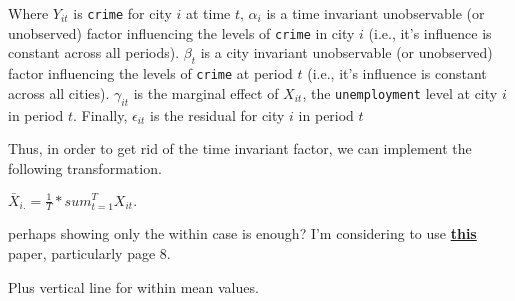 \documentclass[
]{book}
\begin{document}
Where \(Y_{it}\) is \texttt{crime} for city \(i\) at time \(t\), \(\alpha_{i}\) is a time invariant unobservable (or unobserved) factor influencing the levels of \texttt{crime} in city \(i\) (i.e., it's influence is constant across all periods). \(\beta_{t}\) is a city invariant unobservable (or unobserved) factor influencing the levels of \texttt{crime} at period \(t\) (i.e., it's influence is constant across all cities). \(\gamma_{it}\) is the marginal effect of \(X_{it}\), the \texttt{unemployment} level at city \(i\) in period \(t\). Finally, \(\epsilon_{it}\) is the residual for city \(i\) in period \(t\)

Thus, in order to get rid of the time invariant factor, we can implement the following transformation.

\(\bar{X}_{i.} = \frac{1}{T}*sum_{t=1}^{T} X_{it}.\)

{perhaps showing only the within case is enough? I'm considering to use \textbf{\href{https://economics.princeton.edu/wp-content/uploads/2021/08/two_way_mundlak-Wooldridge.pdf}{this}} paper, particularly page 8.}

Plus vertical line for within mean values.
\end{document}
